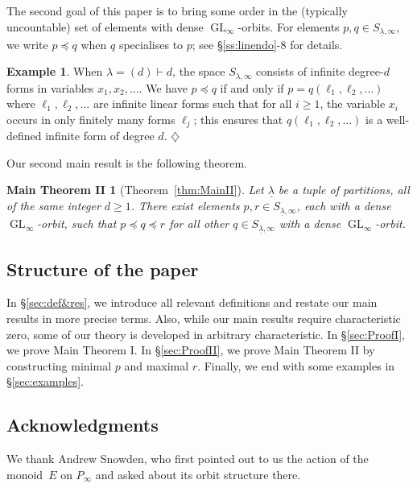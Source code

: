 \documentclass{amsart}
\theoremstyle{plain}
\newtheorem*{main2}{Main Theorem II}
\theoremstyle{definition}
\newtheorem*{ex*}{Example}
\DeclareMathOperator{\GL}{GL}
\begin{document}
The second goal of this paper is to bring some order in the
(typically uncountable) set of elements with dense
$\GL_{\infty}$-orbits. For elements $p,q\in S_{\underline{\lambda},\infty}$, we write $p\preceq q$ when $q$ specialises to $p$; see \S\ref{ss:linendo}-8 for details.

\begin{ex*}
When $\lambda=(d)\vdash d$, the space
$S_{\lambda,\infty}$ consists of infinite degree-$d$ forms
in variables $x_1,x_2,\ldots$. We have $p\preceq q$ if and
only if $p=q(\ell_1,\ell_2,\ldots)$ where
$\ell_1,\ell_2,\ldots$ are infinite linear forms such that
for all $i \geq 1$, the variable $x_i$ occurs in only finitely many forms 
$\ell_j$; this ensures that $q(\ell_1,\ell_2,\ldots)$ is
a well-defined infinite form of degree $d$.
\hfill$\diamondsuit$
\end{ex*}

Our second main result is the following theorem.

\begin{main2}[Theorem~\ref{thm:MainII}]
Let $\underline{\lambda}$ be a tuple of partitions, all  of
the same integer $d\geq1$. 
There exist elements $p,r\in
S_{\underline{\lambda},\infty}$, each with a dense
$\GL_{\infty}$-orbit, such that $p\preceq q\preceq r$ for all other $q\in S_{\underline{\lambda},\infty}$ with a dense $\GL_{\infty}$-orbit.
\end{main2}

\subsection*{Structure of the paper}

In \S\ref{sec:def&res}, we introduce all relevant
definitions and restate our main results in more precise
terms. Also, while our main results require characteristic
zero, some of our theory is developed in arbitrary
characteristic. In \S\ref{sec:ProofI}, we prove Main Theorem I.  In \S\ref{sec:ProofII}, we prove Main Theorem II by constructing minimal $p$ and maximal $r$. Finally, we end with some examples in \S\ref{sec:examples}.

\subsection*{Acknowledgments}

We thank Andrew Snowden, who first pointed out to us the
action of the monoid~$E$ on $P_\infty$ and asked about
its orbit structure there.
\end{document}

